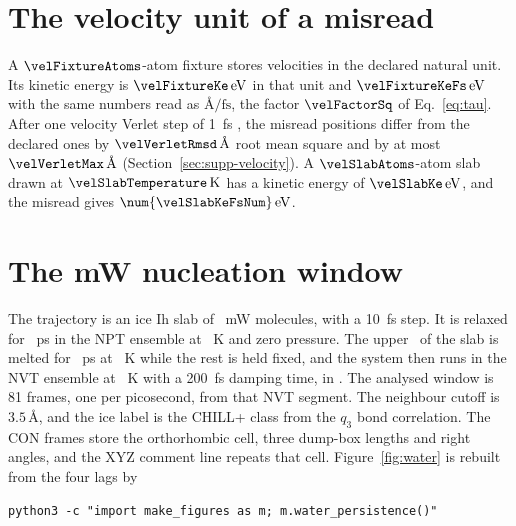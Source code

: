 \section{The velocity unit of a misread}\label{sec:supp-velunit}
A \(\velFixtureAtoms\)-atom fixture stores velocities in the declared natural unit.
Its kinetic energy is \(\velFixtureKe\,\mathrm{eV}\) in that unit and \(\velFixtureKeFs\,\mathrm{eV}\) with the same numbers read as \(\text{\AA}/\mathrm{fs}\), the factor \(\velFactorSq\) of Eq.~\eqref{eq:tau}.
After one velocity Verlet step of 1~fs \cite{swopeComputerSimulationMethod1982}, the misread positions differ from the declared ones by \(\velVerletRmsd\,\text{\AA}\) root mean square and by at most \(\velVerletMax\,\text{\AA}\) (Section~\ref{sec:supp-velocity}).
A \(\velSlabAtoms\)-atom slab drawn at \(\velSlabTemperature\,\mathrm{K}\) has a kinetic energy of \(\velSlabKe\,\mathrm{eV}\), and the misread gives \(\num{\velSlabKeFsNum}\,\mathrm{eV}\).

\section{The mW nucleation window}\label{sec:supp-water}
The trajectory is an ice Ih slab of \mwMolecules\ mW molecules, with a 10~fs step.
It is relaxed for \mwRelaxPs~ps in the NPT ensemble at \mwRelaxK~K and zero pressure.
The upper \mwMeltFrac\ of the slab is melted for \mwMeltPs~ps at \mwMeltK~K while the rest is held fixed, and the system then runs in the NVT ensemble at \mwHoldK~K with a 200~fs damping time, in \mwLammps.
The analysed window is 81 frames, one per picosecond, from that NVT segment.
The neighbour cutoff is \(3.5\,\text{\AA}\), and the ice label is the CHILL+ class from the \(q_3\) bond correlation.
The CON frames store the orthorhombic cell, three dump-box lengths and right angles, and the XYZ comment line repeats that cell.
Figure~\ref{fig:water} is rebuilt from the four lags by
{\small\begin{verbatim}
python3 -c "import make_figures as m; m.water_persistence()"
\end{verbatim}}
